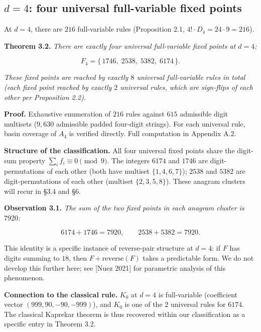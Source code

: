\documentclass[11pt,letterpaper]{article}
\theoremstyle{paperstyle}
\theoremstyle{paperstyledef}
\theoremstyle{paperstylerem}
\begin{document}
\hypertarget{d-4-four-universal-full-variable-fixed-points}{%
\subsection{\texorpdfstring{\(d = 4\): four universal full-variable fixed points}{d = 4: four universal full-variable fixed points}}\label{d-4-four-universal-full-variable-fixed-points}}

At \(d = 4\), there are \(216\) full-variable rules (Proposition 2.1,
\(4! \cdot D_4 = 24 \cdot 9 = 216\)).

\textbf{Theorem 3.2.} \emph{There are exactly four universal
full-variable fixed points at \(d = 4\):}

\[F_4 = \{\, 1746,\; 2538,\; 5382,\; 6174 \,\}.\]

\emph{These fixed points are reached by exactly \(8\) universal
full-variable rules in total (each fixed point reached by exactly \(2\)
universal rules, which are sign-flips of each other per Proposition
2.2).}

\textbf{Proof.} Exhaustive enumeration of \(216\) rules against \(615\)
admissible digit multisets (\(9{,}630\) admissible padded four-digit
strings). For each universal rule, basin coverage of \(A_4\) is verified
directly. Full computation in Appendix A.2.

\textbf{Structure of the classification.} All four universal fixed
points share the digit-sum property \(\sum_i f_i \equiv 0 \pmod 9\). The
integers \(6174\) and \(1746\) are digit-permutations of each other
(both have multiset \(\{1, 4, 6, 7\}\)); \(2538\) and \(5382\) are
digit-permutations of each other (multiset \(\{2, 3, 5, 8\}\)). These
anagram clusters will recur in §3.4 and §6.

\textbf{Observation 3.1.} \emph{The sum of the two fixed points in each
anagram cluster is \(7920\):}

\[6174 + 1746 = 7920, \qquad 2538 + 5382 = 7920.\]

This identity is a specific instance of reverse-pair structure at
\(d = 4\): if \(F\) has digits summing to \(18\), then
\(F + \mathrm{reverse}(F)\) takes a predictable form. We do not develop
this further here; see {[}Nuez 2021{]} for parametric analysis of this
phenomenon.

\textbf{Connection to the classical rule.} \(K_0\) at \(d = 4\) is
full-variable (coefficient vector \((999, 90, -90, -999)\)), and \(K_0\)
is one of the \(2\) universal rules for \(6174\). The classical Kaprekar
theorem is thus recovered within our classification as a specific entry
in Theorem 3.2.
\end{document}
